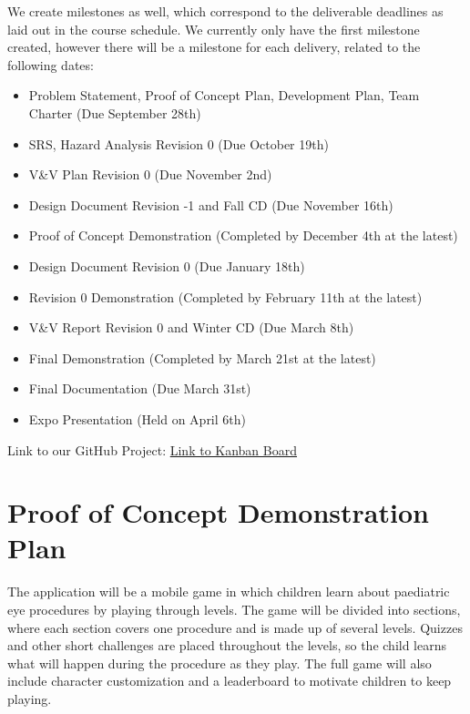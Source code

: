 \documentclass{article}
\begin{document}
We create milestones as well, which correspond to the deliverable deadlines as laid out in the course schedule.
We currently only have the first milestone created, however there will be a milestone for each delivery, related to the following dates:

{\setlength{\leftmargini}{4em}
\begin{itemize}
  \item[\textbf{M1:}] Problem Statement, Proof of Concept Plan, Development Plan, Team Charter (Due September 28th)
  \item[\textbf{M2:}] SRS, Hazard Analysis Revision 0 (Due October 19th)
  \item[\textbf{M3:}] V\&V Plan Revision 0 (Due November 2nd)
  \item[\textbf{M4:}] Design Document Revision -1 and Fall CD (Due November 16th)
  \item[\textbf{M5:}] Proof of Concept Demonstration (Completed by December 4th at the latest)
  \item[\textbf{M6:}] Design Document Revision 0 (Due January 18th)
  \item[\textbf{M7:}] Revision 0 Demonstration (Completed by February 11th at the latest)
  \item[\textbf{M8:}] V\&V Report Revision 0 and Winter CD (Due March 8th)
  \item[\textbf{M9:}] Final Demonstration (Completed by March 21st at the latest)
  \item[\textbf{M10:}] Final Documentation (Due March 31st)
  \item[\textbf{M11:}] Expo Presentation (Held on April 6th)
\end{itemize}
}

Link to our GitHub Project: \href{https://github.com/orgs/team-hindsight/projects/1/views/2}{Link to Kanban Board}

\section{Proof of Concept Demonstration Plan}

The application will be a mobile game in which children learn about paediatric
eye procedures by playing through levels. The game will be divided into
sections, where each section covers one procedure and is made up of several
levels. Quizzes and other short challenges are placed throughout the levels, so
the child learns what will happen during the procedure as they play. The full
game will also include character customization and a leaderboard to motivate
children to keep playing.
\end{document}
